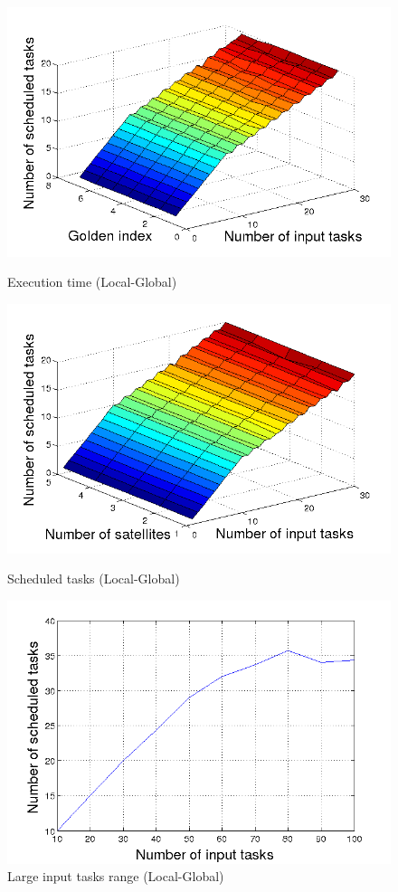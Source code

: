 \begin{figure}[ht]
  \begin{minipage}[b]{0.5\linewidth}
    \includegraphics[width=\linewidth]{Figures/aLG_satsfix.png}
    \caption{Execution time (Local-Global)}\label{fig_aLG_satsfix}
  \end{minipage}   
  \begin{minipage}[b]{0.5\linewidth}
    \includegraphics[width=\linewidth]{Figures/aLG_goldenfix.png}
    \caption{Scheduled tasks (Local-Global)}\label{fig_aLG_goldenfix}
  \end{minipage}

  \begin{minipage}[b]{\linewidth}
  \centering
    \includegraphics[width=0.6\linewidth]{Figures/aLG_alim.png}
    \caption{Large input tasks range (Local-Global)}\label{fig_aLG_alim}
  \centering
  \end{minipage}
  \hfill
\end{figure}


